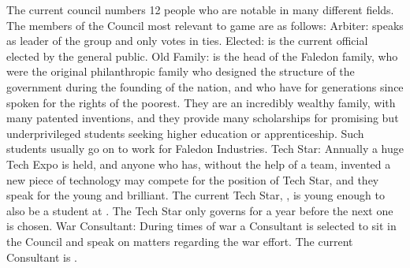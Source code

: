 \documentclass[blue]{GL2020}
\begin{document}
The current council numbers 12 people who are notable in many different fields. The members of the Council most relevant to game are as follows:
		Arbiter:		\cArbiter{} speaks as leader of the group and only votes in ties.
		Elected:	\cElected{} is the current official elected by the general public. 
		Old Family:	\cFaledonParent{} is the head of the Faledon family, who were the original philanthropic family who designed the structure of the government during the founding of the nation, and who have for generations since spoken for the rights of the poorest. They are an incredibly wealthy family, with many patented inventions, and they provide many scholarships for promising but underprivileged students seeking higher education or apprenticeship. Such students usually go on to work for Faledon Industries.
		Tech Star: Annually a huge Tech Expo is held, and anyone who has, without the help of a team, invented a new piece of technology may compete for the position of Tech Star, and they speak for the young and brilliant. The current Tech Star, \cTechStar{}, is young enough to also be a student at \pSchool{}. The Tech Star only governs for a year before the next one is chosen.
		War Consultant: During times of war a Consultant is selected to sit in the Council and speak on matters regarding the war effort.  The current Consultant is \cWar{}.
\end{document}
